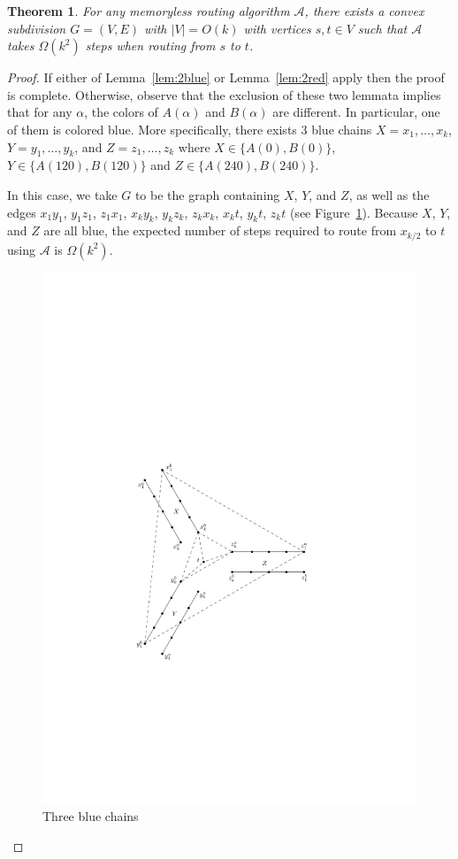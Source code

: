 \documentclass [letterpaper] {patmorin}
\newtheorem{theorem}{Theorem}%
\begin{document}
\begin{theorem}
  \label{thm:quadratic}
  For any
  memoryless routing algorithm $\mathcal{A}$,
  there exists a convex subdivision $G=(V,E)$ with $|V|=O(k)$ with vertices $s,t\in V$ such that $\mathcal{A}$ takes $\Omega(k^2)$ steps when routing from $s$ to $t$.
\end{theorem}

\begin{proof}

If either of Lemma~\ref{lem:2blue} or Lemma~\ref{lem:2red} apply then the proof
is complete.  Otherwise, observe that the exclusion of these two lemmata implies that for any $\alpha$, the colors of $A(\alpha)$ and $B(\alpha)$ are different.
In particular, one of them is colored blue.  More specifically, there exists 3 blue chains $X=x_1,\ldots,x_k$, $Y=y_1,\ldots,y_k$, and $Z=z_1,\ldots,z_k$ where $X\in\{A(0),B(0)\}$, $Y\in\{A(120),B(120)\}$ and $Z\in\{A(240),B(240)\}$.

In this case, we take $G$ to be the graph containing $X$, $Y$, and $Z$,
as well as the edges $x_1y_1$, $y_1z_1$, $z_1x_1$, $x_ky_k$, $y_kz_k$,
$z_kx_k$, $x_kt$, $y_kt$, $z_kt$ (see Figure~\ref{fig:3blue}).  Because
$X$, $Y$, and $Z$ are all blue, the expected number of steps required
to route from $x_{k/2}$ to $t$ using $\mathcal{A}$ is $\Omega(k^2)$.

\begin{figure}[ht]
  \centering
  \includegraphics{pics/3blue.pdf}
  \caption{Three blue chains}
  \label{fig:3blue}
\end{figure}


\end{proof}
\end{document}

